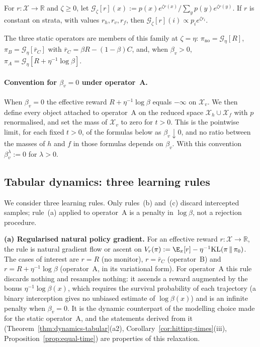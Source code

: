 \begin{definition}\label{def:gibbs-family}
For $r:\mathcal X\to\mathbb R$ and $\zeta\ge 0$, let
$\mathcal G_\zeta[r](x):=p(x)e^{\zeta r(x)}/\sum_y p(y)e^{\zeta r(y)}$.
If $r$ is constant on strata, with values $r_h,r_v,r_f$, then
$\mathcal G_\zeta[r](i)\propto p_i e^{\zeta r_i}$.
\end{definition}

The three static operators are members of this family at $\zeta=\eta$:
$\pi_{\mathrm{no}}=\mathcal G_\eta[R]$,
$\pi_B=\mathcal G_\eta[\bar r_C]$ with
$\bar r_C=\beta R-(1-\beta)C$, and, when $\beta_v>0$,
$\pi_A=\mathcal G_\eta[R+\eta^{-1}\log\beta]$.

\paragraph{Convention for $\beta_v=0$ under operator~A.}
When $\beta_v=0$ the effective reward $R+\eta^{-1}\log\beta$ equals
$-\infty$ on $\mathcal X_v$. We then define every object attached to
operator~A on the reduced space $\mathcal X_h\cup\mathcal X_f$ with $p$
renormalised, and set the mass of $\mathcal X_v$ to zero for $t>0$. This is
the pointwise limit, for each fixed $t>0$, of the formulas below as
$\beta_v\downarrow 0$, and no ratio between the masses of $h$ and $f$ in
those formulas depends on $\beta_v$. With this convention $\beta_v^{\lambda}:=0$
for $\lambda>0$.

\subsection{Tabular dynamics: three learning rules}

We consider three learning rules. Only rules~(b) and~(c) discard intercepted samples; rule~(a) applied to operator~A is a penalty in $\log\beta$, not a rejection procedure.

\smallskip\noindent\textbf{(a) Regularised natural policy gradient.}
For an effective reward $r:\mathcal X\to\mathbb R$, the rule is natural
gradient flow or ascent on
$V_r(\pi):=\E_\pi[r]-\eta^{-1}\mathrm{KL}(\pi\,\|\,\pi_0)$. The cases of
interest are $r=R$ (no monitor), $r=\bar r_C$ (operator~B) and
$r=R+\eta^{-1}\log\beta$ (operator~A, in its variational form). For operator~A this rule discards nothing and resamples nothing: it ascends a reward augmented by the bonus $\eta^{-1}\log\beta(x)$, which requires the survival probability of each trajectory (a binary interception gives no unbiased estimate of $\log\beta(x)$) and is an infinite penalty when $\beta_v=0$. It is the dynamic counterpart of the modelling choice made for the static operator~A, and the statements derived from it (Theorem~\ref{thm:dynamics-tabular}(a2), Corollary~\ref{cor:hitting-times}(iii), Proposition~\ref{prop:equal-time}) are properties of this relaxation.

